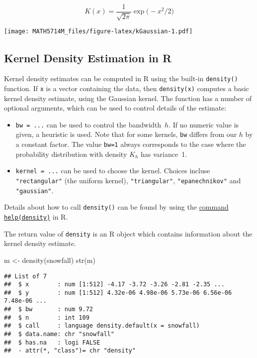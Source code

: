 \documentclass[
  a4paper,
]{article}
\newenvironment{Shaded}{\begin{snugshade}}{\end{snugshade}}
\newcommand{\FunctionTok}[1]{\textcolor[rgb]{0.00,0.00,0.00}{#1}}
\newcommand{\NormalTok}[1]{#1}
\newcommand{\OtherTok}[1]{\textcolor[rgb]{0.56,0.35,0.01}{#1}}
\theoremstyle{definition}
\theoremstyle{definition}
\theoremstyle{definition}
\theoremstyle{definition}
\theoremstyle{remark}
\begin{document}
\begin{equation*}
  K(x)
  = \frac{1}{\sqrt{2\pi}} \exp\bigl(-x^2/2\bigr)
\end{equation*}

\texttt{[image: MATH5714M\_files/figure-latex/kGaussian-1.pdf]}

\hypertarget{kernel-density-estimation-in-r}{%
\subsection{Kernel Density Estimation in R}\label{kernel-density-estimation-in-r}}

Kernel density estimates can be computed in R using the built-in
\texttt{density()} function. If \texttt{x} is a vector containing the data, then
\texttt{density(x)} computes a basic kernel density estimate, using the
Gaussian kernel. The function has a number of optional arguments,
which can be used to control details of the estimate:

\begin{itemize}
\item
  \texttt{bw\ =\ ...} can be used to control the bandwidth~\(h\).
  If no numeric value is given, a heuristic is used.
  Note that for some kernels, \texttt{bw} differs from our \(h\)
  by a constant factor. The value \texttt{bw=1} always corresponds
  to the case where the probability distribution with density
  \(K_h\) has variance~1.
\item
  \texttt{kernel\ =\ ...} can be used to choose the kernel.
  Choices incluse \texttt{"rectangular"} (the uniform kernel), \texttt{"triangular"},
  \texttt{"epanechnikov"} and \texttt{"gaussian"}.
\end{itemize}

Details about how to call \texttt{density()} can be found by using the
\href{https://rdrr.io/r/stats/density.html}{command \texttt{help(density)}} in R.

The return value of \texttt{density} is an R object which contains information
about the kernel density estimate.

\begin{Shaded}
\begin{Highlighting}[]
\NormalTok{m }\OtherTok{\textless{}{-}} \FunctionTok{density}\NormalTok{(snowfall)}
\FunctionTok{str}\NormalTok{(m)}
\end{Highlighting}
\end{Shaded}

\begin{verbatim}
## List of 7
##  $ x        : num [1:512] -4.17 -3.72 -3.26 -2.81 -2.35 ...
##  $ y        : num [1:512] 4.32e-06 4.98e-06 5.73e-06 6.56e-06 7.48e-06 ...
##  $ bw       : num 9.72
##  $ n        : int 109
##  $ call     : language density.default(x = snowfall)
##  $ data.name: chr "snowfall"
##  $ has.na   : logi FALSE
##  - attr(*, "class")= chr "density"
\end{verbatim}
\end{document}
